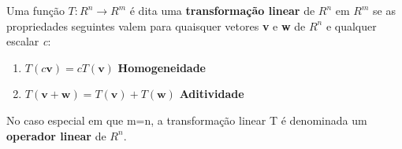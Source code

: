 \documentclass[a4paper]{article}
\newtheorem{theorem}{Teorema}[section]
\newenvironment{definition}[1][Definição]{\begin{trivlist}
\item[\hskip \labelsep {\bfseries #1}]}{\end{trivlist}}
\begin{document}
\begin{definition}
Uma função $T:R^n \longrightarrow R^m$ é dita uma \textbf{transformação linear} de $R^n$ em $R^m$ se as propriedades seguintes valem para quaisquer vetores \textbf{v} e \textbf{w} de $R^n$ e qualquer escalar \textit{c}:
\begin{enumerate}[label=\roman*]
\item $T(c\textbf{v})=cT(\textbf{v})$ \textbf{Homogeneidade}
\item $T(\textbf{v}+\textbf{w})= T(\textbf{v}) + T(\textbf{w})$ \textbf{Aditividade}
\end{enumerate}
No caso especial em que m=n, a transformação linear T é denominada um \textbf{operador linear} de $R^n$.
\end{definition}



\end{document}
